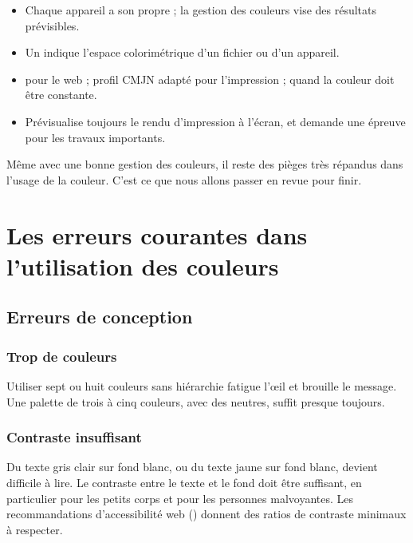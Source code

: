 \begin{retenir}
\begin{itemize}
  \item Chaque appareil a son propre  ; la gestion des couleurs vise des résultats prévisibles.
  \item Un  indique l'espace colorimétrique d'un fichier ou d'un appareil.
  \item {} pour le web ; profil CMJN adapté pour l'impression ;  quand la couleur doit être constante.
  \item Prévisualise toujours le rendu d'impression à l'écran, et demande une épreuve pour les travaux importants.
\end{itemize}
\end{retenir}

Même avec une bonne gestion des couleurs, il reste des pièges très répandus dans l'usage de la couleur. C'est ce que nous allons passer en revue pour finir.

\section{Les erreurs courantes dans l'utilisation des couleurs}

\subsection{Erreurs de conception}

\subsubsection{Trop de couleurs}

Utiliser sept ou huit couleurs sans hiérarchie fatigue l'œil et brouille le message. Une palette de trois à cinq couleurs, avec des neutres, suffit presque toujours.

\subsubsection{Contraste insuffisant}

Du texte gris clair sur fond blanc, ou du texte jaune sur fond blanc, devient difficile à lire. Le contraste entre le texte et le fond doit être suffisant, en particulier pour les petits corps et pour les personnes malvoyantes. Les recommandations d'accessibilité web () donnent des ratios de contraste minimaux à respecter.

